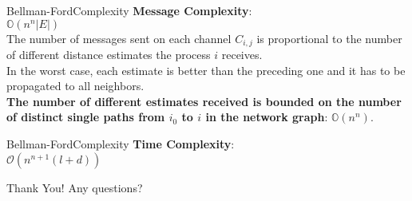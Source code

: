 \documentclass[pdf]{beamer}
\begin{document}
\begin{frame}{Bellman-Ford}{Complexity}
    \textbf{Message Complexity}: \\
    \vspace{8pt}
    $\mathbb{O}(n^n |E|)$ \\
    \vspace{8pt}
    \small
    The number of messages sent on each channel $C_{i, j}$ is proportional to the number of different distance estimates the process $i$ receives. \\
    \vspace{8pt}
    In the worst case, each estimate is better than the preceding one and it has to be propagated to all neighbors. \\
    \vspace{8pt}
    \textbf{The number of different estimates received is bounded on the number of distinct single paths from $i_0$ to $i$ in the network graph}: $\mathbb{O}(n^n)$.
\end{frame}

\begin{frame}{Bellman-Ford}{Complexity}
    \normalsize
    \textbf{Time Complexity}: \\
    \vspace{12pt}
    \pause
    $\mathcal{O}(n^{n+1}(l+d))$ \\
\end{frame}

\begin{frame}{Thank You!}
    \large
    Any questions?
\end{frame}
\end{document}
